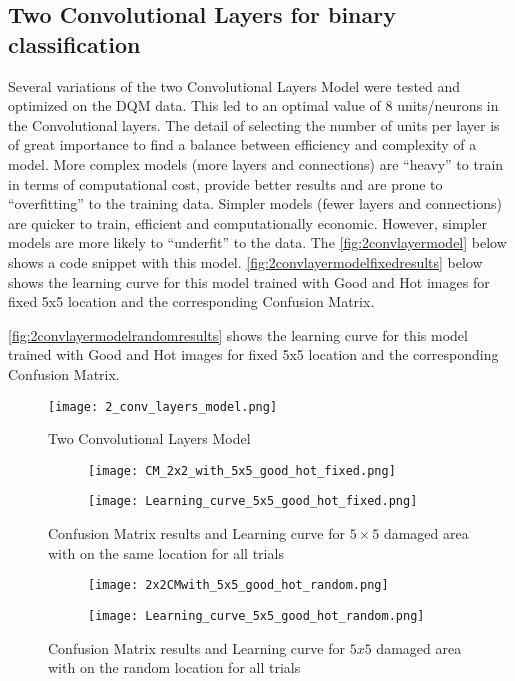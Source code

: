 \subsection{Two Convolutional Layers for binary classification}
Several variations of the two Convolutional Layers Model were tested and optimized on the DQM data. This led to an optimal value of 8 units/neurons in the Convolutional layers. 
The detail of selecting the number of units per layer is of great importance to find a balance between efficiency and complexity of a model. More complex models (more layers and connections) are “heavy” to train in terms of computational cost, provide better results and are prone to “overfitting” to the training data.
 Simpler models (fewer layers and connections) are quicker to train, efficient and computationally economic. However, simpler models are more likely to “underfit” to the data. The \autoref{fig:2convlayermodel} below shows a code snippet with this model.
\autoref{fig:2convlayermodelfixedresults} below shows the learning curve for this model trained with Good and Hot images for fixed 5x5 location and the corresponding Confusion Matrix.

\autoref{fig:2convlayermodelrandomresults} shows the learning curve for this model trained with Good and Hot images for fixed 5x5 location and the corresponding Confusion Matrix.

\begin{figure}
\begin{center}
    \texttt{[image: 2\_conv\_layers\_model.png]}
\end{center}
\caption{Two Convolutional Layers Model\label{fig:2convlayermodel}}
\end{figure}


\begin{figure}
\centering
	\begin{subfigure}{.45\textwidth}
 	\texttt{[image: CM\_2x2\_with\_5x5\_good\_hot\_fixed.png]}
	\end{subfigure}
	\begin{subfigure}{.45\textwidth}
	\texttt{[image: Learning\_curve\_5x5\_good\_hot\_fixed.png]}
	\end{subfigure}
	\caption{Confusion Matrix results and Learning curve
	 for $5\times 5$ damaged area with on the same location for all trials\label{fig:2convlayermodelfixedresults}}
 \end{figure}
 
 \begin{figure}
 	\begin{subfigure}{.45\textwidth}
 		\texttt{[image: 2x2CMwith\_5x5\_good\_hot\_random.png]}
 	\end{subfigure}
 	\begin{subfigure}{.45\textwidth}
 	\texttt{[image: Learning\_curve\_5x5\_good\_hot\_random.png]}
 	\end{subfigure}
 \caption{Confusion Matrix results and Learning curve
	 for $5x5$ damaged area with on the random location for all trials\label{fig:2convlayermodelrandomresults}}
 \end{figure}
 

